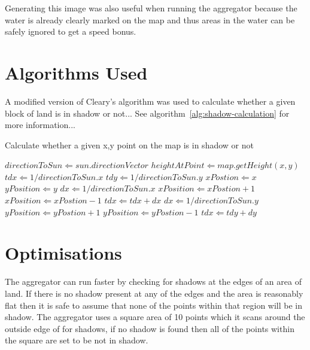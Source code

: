 \documentclass[12pt]{report}
\begin{document}
Generating this image was also useful when running the aggregator because the water is already clearly marked on the map and thus areas in the water can be safely ignored to get a speed bonus. 



\section{Algorithms Used}
A modified version of Cleary's algorithm was used to calculate whether a given block of land is in shadow or not... See algorithm~\ref{alg:shadow-calculation} for more information... 



\begin{algorithm}[h]
\caption{Calculate whether a given x,y point on the map is in shadow or not}
\label{alg:shadow-calculation}%
\begin{algorithmic}           %
\STATE $directionToSun \Leftarrow sun.directionVector$
\STATE $heightAtPoint \Leftarrow map.getHeight(x,y)$
\STATE $tdx \Leftarrow 1 / directionToSun.x$
\STATE $tdy \Leftarrow 1 / directionToSun.y$
\STATE $xPostion \Leftarrow x$
\STATE $yPosition \Leftarrow y$
	\ENDIF
		\STATE $dx \Leftarrow 1 / directionToSun.x$
			\STATE $xPosition \Leftarrow xPostion + 1$	
		\ELSE
			\STATE $xPosition \Leftarrow xPostion - 1$	
		\ENDIF
		\STATE $tdx \Leftarrow tdx + dx$
	\ELSE
		\STATE $dx \Leftarrow 1 / directionToSun.y$
			\STATE $yPosition \Leftarrow yPostion + 1$	
		\ELSE
			\STATE $yPosition \Leftarrow yPostion - 1$	
		\ENDIF
		\STATE $tdx \Leftarrow tdy + dy$		
	\ENDIF
\ENDWHILE
{}
\end{algorithmic}
\end{algorithm}

\section{Optimisations}
The aggregator can run faster by checking for shadows at the edges of an area of land. If there is no shadow present at any of the edges and the area is reasonably flat then it is safe to assume that none of the points within that region will be in shadow. The aggregator uses a square area of 10 points which it scans around the outside edge of for shadows, if no shadow is found then all of the points within the square are set to be not in shadow.
\end{document}
